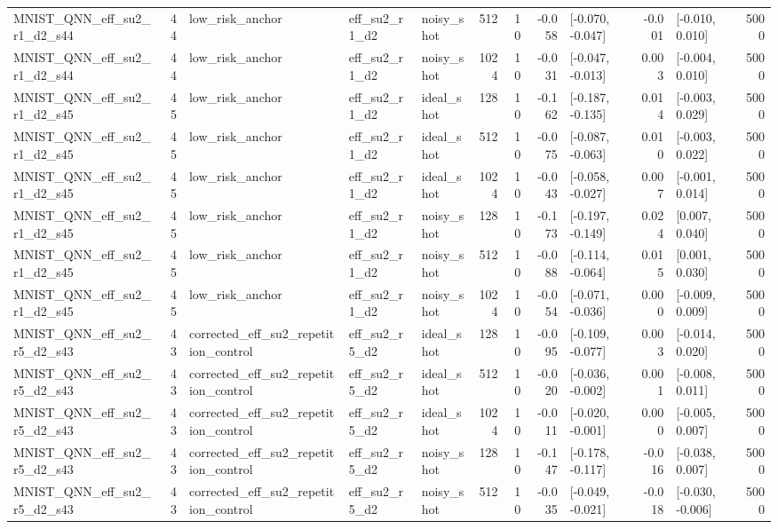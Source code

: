 \begin{table}[t]
\begin{tabular}{lrlllrrrlrlr}
MNIST\_QNN\_eff\_su2\_r1\_d2\_s44 & 44 & low\_risk\_anchor & eff\_su2\_r1\_d2 & noisy\_shot & 512 & 10 & -0.058 & [-0.070, -0.047] & -0.001 & [-0.010, 0.010] & 5000 \\
MNIST\_QNN\_eff\_su2\_r1\_d2\_s44 & 44 & low\_risk\_anchor & eff\_su2\_r1\_d2 & noisy\_shot & 1024 & 10 & -0.031 & [-0.047, -0.013] & 0.003 & [-0.004, 0.010] & 5000 \\
MNIST\_QNN\_eff\_su2\_r1\_d2\_s45 & 45 & low\_risk\_anchor & eff\_su2\_r1\_d2 & ideal\_shot & 128 & 10 & -0.162 & [-0.187, -0.135] & 0.014 & [-0.003, 0.029] & 5000 \\
MNIST\_QNN\_eff\_su2\_r1\_d2\_s45 & 45 & low\_risk\_anchor & eff\_su2\_r1\_d2 & ideal\_shot & 512 & 10 & -0.075 & [-0.087, -0.063] & 0.010 & [-0.003, 0.022] & 5000 \\
MNIST\_QNN\_eff\_su2\_r1\_d2\_s45 & 45 & low\_risk\_anchor & eff\_su2\_r1\_d2 & ideal\_shot & 1024 & 10 & -0.043 & [-0.058, -0.027] & 0.007 & [-0.001, 0.014] & 5000 \\
MNIST\_QNN\_eff\_su2\_r1\_d2\_s45 & 45 & low\_risk\_anchor & eff\_su2\_r1\_d2 & noisy\_shot & 128 & 10 & -0.173 & [-0.197, -0.149] & 0.024 & [0.007, 0.040] & 5000 \\
MNIST\_QNN\_eff\_su2\_r1\_d2\_s45 & 45 & low\_risk\_anchor & eff\_su2\_r1\_d2 & noisy\_shot & 512 & 10 & -0.088 & [-0.114, -0.064] & 0.015 & [0.001, 0.030] & 5000 \\
MNIST\_QNN\_eff\_su2\_r1\_d2\_s45 & 45 & low\_risk\_anchor & eff\_su2\_r1\_d2 & noisy\_shot & 1024 & 10 & -0.054 & [-0.071, -0.036] & 0.000 & [-0.009, 0.009] & 5000 \\
MNIST\_QNN\_eff\_su2\_r5\_d2\_s43 & 43 & corrected\_eff\_su2\_repetition\_control & eff\_su2\_r5\_d2 & ideal\_shot & 128 & 10 & -0.095 & [-0.109, -0.077] & 0.003 & [-0.014, 0.020] & 5000 \\
MNIST\_QNN\_eff\_su2\_r5\_d2\_s43 & 43 & corrected\_eff\_su2\_repetition\_control & eff\_su2\_r5\_d2 & ideal\_shot & 512 & 10 & -0.020 & [-0.036, -0.002] & 0.001 & [-0.008, 0.011] & 5000 \\
MNIST\_QNN\_eff\_su2\_r5\_d2\_s43 & 43 & corrected\_eff\_su2\_repetition\_control & eff\_su2\_r5\_d2 & ideal\_shot & 1024 & 10 & -0.011 & [-0.020, -0.001] & 0.000 & [-0.005, 0.007] & 5000 \\
MNIST\_QNN\_eff\_su2\_r5\_d2\_s43 & 43 & corrected\_eff\_su2\_repetition\_control & eff\_su2\_r5\_d2 & noisy\_shot & 128 & 10 & -0.147 & [-0.178, -0.117] & -0.016 & [-0.038, 0.007] & 5000 \\
MNIST\_QNN\_eff\_su2\_r5\_d2\_s43 & 43 & corrected\_eff\_su2\_repetition\_control & eff\_su2\_r5\_d2 & noisy\_shot & 512 & 10 & -0.035 & [-0.049, -0.021] & -0.018 & [-0.030, -0.006] & 5000 \\

\end{tabular}
\end{table}
